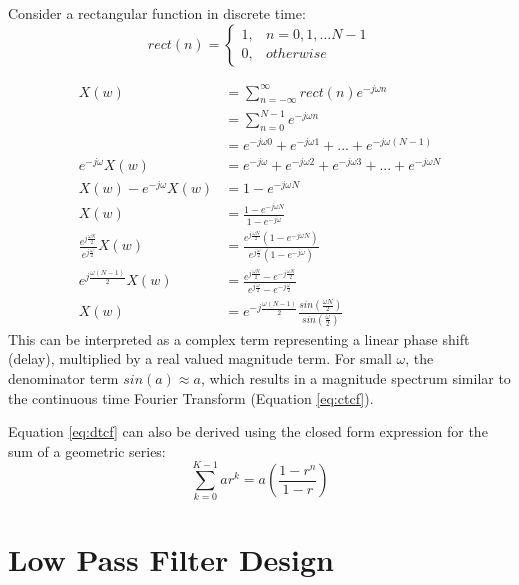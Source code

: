 \documentclass{article}
\begin{document}
Consider a rectangular function in discrete time:
\begin{equation}
rect(n)= 
	\begin{cases}
      1, & n=0,1, \ldots N-1 \\
      0, & otherwise
	\end{cases}
\end{equation}

\begin{equation} \label{eq:dtcf}
\begin{split}
                     X(w) &= \sum_{n=-\infty}^{\infty} rect(n) e^{-j \omega n} \\
                          &= \sum_{n=0}^{N-1} e^{-j \omega n} \\
                          &= e^{-j \omega 0} + e^{-j \omega 1} + ... + e^{-j \omega (N-1)} \\
       e^{-j \omega} X(w) &= e^{-j \omega} + e^{-j \omega 2} + e^{-j \omega 3} + ... + e^{-j \omega N} \\
X(w) - e^{-j \omega} X(w) &= 1 - e^{-j \omega N} \\
                     X(w) &= \frac{1 - e^{-j \omega N}}{1 - e^{-j \omega}} \\
\frac{e^{j \frac{\omega N}{2}}}{e^{j \frac{\omega}{2}}} X(w) &= \frac{e^{j \frac{\omega N}{2}}(1 - e^{-j \omega N})}{e^{j \frac{\omega}{2}}(1 - e^{-j \omega})} \\
e^{j \frac{\omega (N-1)}{2}} X(w) &= \frac{e^{j \frac{\omega N}{2}} - e^{-j \frac{\omega N}{2}}}{e^{j \frac{\omega}{2}} - e^{-j \frac{\omega}{2}}} \\
X(w) &= e^{-j \frac{\omega (N-1)}{2}} \frac{sin(\frac{\omega N}{2})}{sin(\frac{\omega}{2})}
\end{split}
\end{equation}
This can be interpreted as a complex term representing a linear phase shift (delay), multiplied by a real valued magnitude term.  For small $\omega$, the denominator term $sin(a) \approx a$, which results in a magnitude spectrum similar to the continuous time Fourier Transform (Equation \ref{eq:ctcf}).

Equation \ref{eq:dtcf} can also be derived using the closed form expression for the sum of a geometric series:
\begin{equation} \label{eq_geosum}
\sum_{k=0}^{K-1} ar^k = a \left( \frac{1-r^n}{1-r} \right)
\end{equation}

\section {Low Pass Filter Design}
\end{document}
